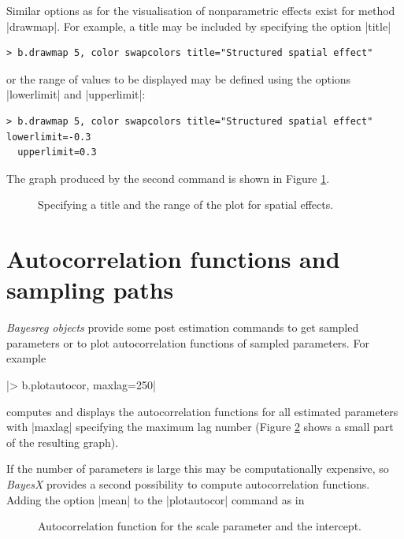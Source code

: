 \documentclass[a4paper]{article}
\begin{document}
Similar options as for the visualisation of nonparametric effects exist for method |drawmap|. For example, a title may be
included by specifying the option |title|

\begin{verbatim}
> b.drawmap 5, color swapcolors title="Structured spatial effect"
\end{verbatim}

or the range of values to be displayed may be defined using the options |lowerlimit| and |upperlimit|:

\begin{verbatim}
> b.drawmap 5, color swapcolors title="Structured spatial effect" lowerlimit=-0.3
  upperlimit=0.3
\end{verbatim}

The graph produced by the second command is shown in Figure
\ref{spat4}.

\begin{figure}[ht]
\begin{center}
{\it\caption{Specifying a title and the range of the plot for
spatial effects.\label{spat4}}}
\end{center}
\end{figure}

\section{Autocorrelation functions and sampling paths}\label{postest}

{\em Bayesreg objects} provide some post estimation commands to
get sampled parameters or to plot autocorrelation functions of
sampled parameters. For example

|> b.plotautocor, maxlag=250|

computes and displays the autocorrelation functions for all estimated parameters with |maxlag| specifying the maximum lag
number (Figure \ref{autocor1} shows a small part of the resulting graph).

If the number of parameters is large this may be computationally expensive, so {\it BayesX} provides a second possibility to
compute autocorrelation functions. Adding the option |mean| to the |plotautocor| command as in

\begin{figure}[ht]
\begin{center}
{\it\caption{Autocorrelation function for the scale parameter and
the intercept.\label{autocor1}}}
\end{center}
\end{figure}
\end{document}
